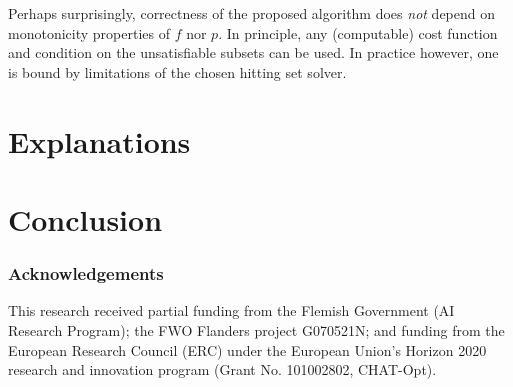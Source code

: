 \documentclass{llncs}
\begin{document}
Perhaps surprisingly, correctness of the proposed algorithm does \emph{not} depend on monotonicity properties of $f$ nor $p$. In principle, any (computable) cost function and condition on the unsatisfiable subsets can be used. In practice however, one is bound by limitations of the chosen hitting set solver.

\section{Explanations}

\section{Conclusion}

\subsubsection{Acknowledgements} This research received partial funding from the Flemish Government (AI Research Program); the FWO Flanders project G070521N; and funding from the European Research Council (ERC) under the European Union’s Horizon 2020 research and innovation program (Grant No. 101002802, CHAT-Opt).

%
%
%
 
 
\end{document}
